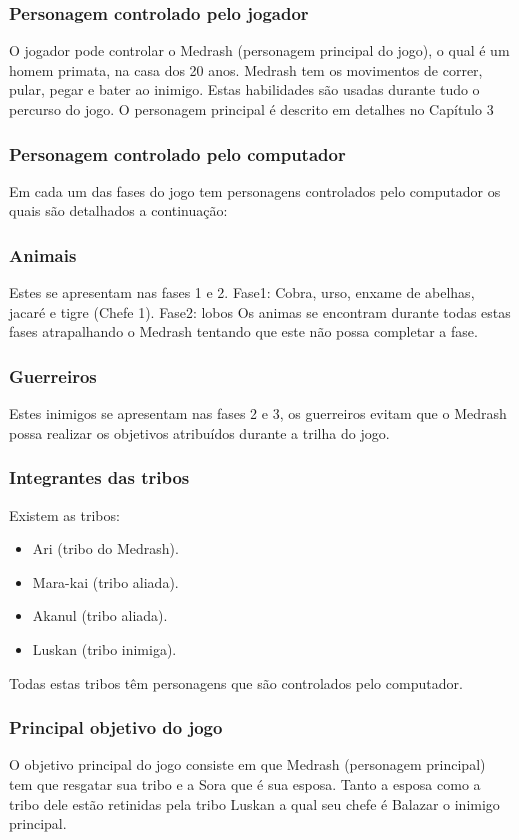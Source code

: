 \subsubsection{Personagem controlado pelo jogador}
O jogador pode controlar o Medrash (personagem principal do jogo), o qual é um 
homem primata, na casa dos 20 anos. Medrash tem os movimentos de correr, pular, 
pegar e bater ao inimigo. Estas habilidades são usadas durante tudo o percurso do jogo. 
O personagem principal é descrito em detalhes no Capítulo 3

\subsubsection{Personagem controlado pelo computador}
Em cada um das fases do jogo tem personagens controlados pelo computador os quais 
são detalhados a continuação:


\subsubsection{Animais}
Estes se apresentam nas fases 1 e 2.
Fase1: Cobra, urso, enxame de abelhas, jacaré e tigre (Chefe 1).
Fase2: lobos
Os animas se encontram durante todas estas fases atrapalhando o Medrash tentando
que este não possa completar a fase. 

\subsubsection{Guerreiros}
Estes inimigos se apresentam nas fases 2 e 3, os guerreiros evitam que o Medrash 
possa realizar os objetivos atribuídos durante a trilha do jogo. 

\subsubsection{Integrantes das tribos}
Existem as tribos:
\begin{itemize}
\item Ari (tribo do Medrash).
\item Mara-kai (tribo aliada).
\item Akanul (tribo aliada).
\item Luskan (tribo inimiga).
\end{itemize}
Todas estas tribos têm personagens que são controlados pelo computador.

\subsubsection{Principal objetivo do jogo}
O objetivo principal do jogo consiste em que Medrash (personagem principal) tem
 que resgatar sua tribo e a Sora que é sua esposa. Tanto a esposa como a tribo dele
 estão retinidas pela tribo Luskan a qual seu chefe é Balazar o inimigo principal. 

